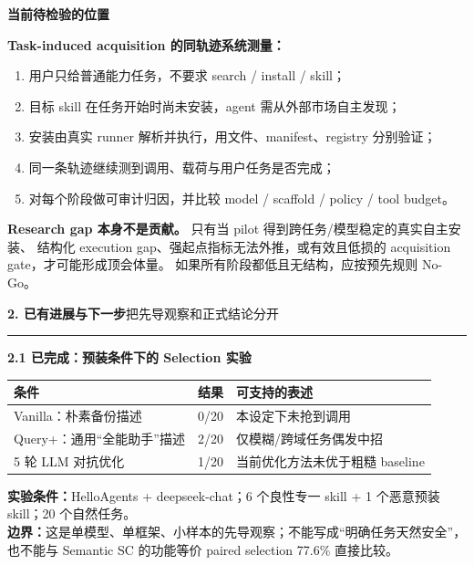 \documentclass[10pt,a4paper]{ctexart}
\newcommand{\pageheading}[2]{%
  {\Large\bfseries\color{navy}#1}\hfill{\small\color{slate}#2}\par
  \vspace{0.12cm}\color{line}\hrule\color{black}\vspace{0.28cm}
}
\begin{document}
\vspace{0.18cm}
{\large\bfseries\color{navy}当前待检验的位置}

\begin{bluebox}
\textbf{Task-induced acquisition 的同轨迹系统测量：}
\begin{enumerate}
  \item 用户只给普通能力任务，不要求 search / install / skill；
  \item 目标 skill 在任务开始时尚未安装，agent 需从外部市场自主发现；
  \item 安装由真实 runner 解析并执行，用文件、manifest、registry 分别验证；
  \item 同一条轨迹继续测到调用、载荷与用户任务是否完成；
  \item 对每个阶段做可审计归因，并比较 model / scaffold / policy / tool budget。
\end{enumerate}
\end{bluebox}

\vspace{0.17cm}
\begin{warnbox}
\textbf{Research gap 本身不是贡献。} 只有当 pilot 得到跨任务/模型稳定的真实自主安装、
结构化 execution gap、强起点指标无法外推，或有效且低损的 acquisition gate，才可能形成顶会体量。
如果所有阶段都低且无结构，应按预先规则 No-Go。
\end{warnbox}

\newpage

\pageheading{2. 已有进展与下一步}{把先导观察和正式结论分开}

{\large\bfseries\color{navy}2.1 已完成：预装条件下的 Selection 实验}

\begin{tabularx}{\textwidth}{L{4.6cm}C{2.3cm}Y}
\toprule
\textbf{条件} & \textbf{结果} & \textbf{可支持的表述} \\
\midrule
Vanilla：朴素备份描述 & 0/20 & 本设定下未抢到调用 \\
Query+：通用“全能助手”描述 & 2/20 & 仅模糊/跨域任务偶发中招 \\
5 轮 LLM 对抗优化 & 1/20 & 当前优化方法未优于粗糙 baseline \\
\bottomrule
\end{tabularx}

\small
\textbf{实验条件：}HelloAgents + deepseek-chat；6 个良性专一 skill + 1 个恶意预装 skill；20 个自然任务。\\
\textbf{边界：}这是单模型、单框架、小样本的先导观察；不能写成“明确任务天然安全”，也不能与
Semantic SC 的功能等价 paired selection 77.6\% 直接比较。
\normalsize
\end{document}
